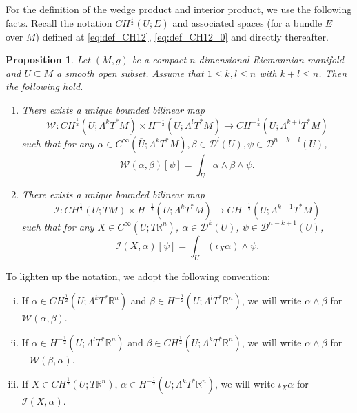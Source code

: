 \documentclass[12pt]{article}
\newcommand{\R}{\mathbb{R}}
\theoremstyle{plain}
\newtheorem{proposition}[theorem]{Proposition}
\numberwithin{equation}{section}
\begin{document}
 For the definition of the wedge product and interior product, we use the following facts. Recall the notation $CH^\frac12(U;E)$ and associated spaces (for a bundle $E$ over $M$) defined at \eqref{eq:def_CH12}, \eqref{eq:def_CH12_0} and directly thereafter.
    \begin{proposition} \label{prop:WeakProducts}
        Let $(M,g)$ be a compact $n$-dimensional Riemannian manifold and $U \subseteq M$ a smooth open subset. Assume that $1\leq k,l\leq n$ with $k+l \leq n$. Then the following hold.
        \begin{enumerate}
            \item[(i)] There exists a unique bounded bilinear map
            \begin{equation*}
                \mathcal{W} : CH^\frac12(U;\Lambda^kT^*M) \times H^{-\frac12}(U;\Lambda^l T^*M) \to CH^{-\frac12}(U;\Lambda^{k+l}T^*M)
            \end{equation*}
            such that for any $\alpha \in C^\infty(\overline U;\Lambda^k T^*M), \beta \in \mathcal{D}^l(U), \psi \in \mathcal{D}^{n-k-l}(U)$,
            \begin{equation*}
                \mathcal{W}(\alpha,\beta)[\psi] = \int_U \alpha \wedge \beta \wedge \psi.
            \end{equation*}
            \item[(ii)] There exists a unique bounded bilinear map
            \begin{equation*}
                \mathcal{I} : CH^\frac12(U;TM) \times H^{-\frac12}(U;\Lambda^k T^*M) \to CH^{-\frac12}(U;\Lambda^{k-1}T^*M)
            \end{equation*}
            such that for any $X \in C^\infty(\overline U; T\R^n)$, $\alpha \in \mathcal{D}^{k}(U)$, $\psi \in \mathcal{D}^{n-k+1}(U)$,
            \begin{equation*}
                \mathcal{I}(X,\alpha)[\psi] = \int_U (\iota_X \alpha) \wedge \psi.
            \end{equation*}
        \end{enumerate}
    \end{proposition}
    To lighten up the notation, we adopt the following convention:
    \begin{enumerate}[(i)]
        \item If $\alpha \in CH^{\frac12}(U;\Lambda^k T^*\R^n)$ and $\beta \in H^{-\frac12}(U;\Lambda^l T^*\R^n)$, we will write $\alpha \wedge \beta$ for $\mathcal{W}(\alpha, \beta)$. 
        \item If $\alpha \in H^{-\frac12}(U;\Lambda^l T^*\R^n)$ and $\beta \in CH^{\frac12}(U;\Lambda^k T^*\R^n)$, we will write $\alpha \wedge \beta$ for $-\mathcal{W}(\beta,\alpha)$.
        \item If $X \in CH^{\frac12}(U;T\R^n)$, $\alpha \in H^{-\frac12}(U;\Lambda^k T^*\R^n)$, we will write $\iota_X \alpha$ for $\mathcal{I}(X,\alpha)$.
    \end{enumerate}
    
\end{document}
